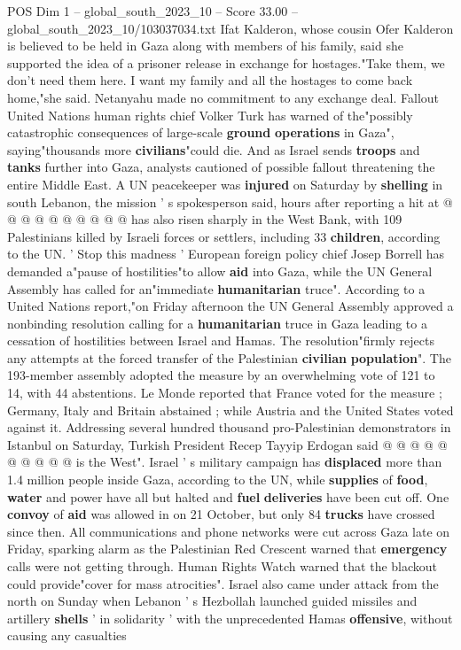 \begin{textsample}{POS Dim 1 – global\_south\_2023\_10 – Score 33.00 – global\_south\_2023\_10/103037034.txt}
Ifat Kalderon, whose cousin Ofer Kalderon is believed to be held in Gaza along with members of his family, said she supported the idea of a prisoner release in exchange for hostages."Take them, we don't need them here.
I want my family and all the hostages to come back home,"she said.
Netanyahu made no commitment to any exchange deal.
Fallout United Nations human rights chief Volker Turk has warned of the"possibly catastrophic consequences of large-scale \textbf{ground} \textbf{operations} in Gaza", saying"thousands more \textbf{civilians}"could die.
And as Israel sends \textbf{troops} and \textbf{tanks} further into Gaza, analysts cautioned of possible fallout threatening the entire Middle East.
A UN peacekeeper was \textbf{injured} on Saturday by \textbf{shelling} in south Lebanon, the mission ' s spokesperson said, hours after reporting a hit at @ @ @ @ @ @ @ @ @ @ has also risen sharply in the West Bank, with 109 Palestinians killed by Israeli forces or settlers, including 33 \textbf{children}, according to the UN. ' Stop this madness ' European foreign policy chief Josep Borrell has demanded a"pause of hostilities"to allow \textbf{aid} into Gaza, while the UN General Assembly has called for an"immediate \textbf{humanitarian} truce".
According to a United Nations report,"on Friday afternoon the UN General Assembly approved a nonbinding resolution calling for a \textbf{humanitarian} truce in Gaza leading to a cessation of hostilities between Israel and Hamas.
The resolution"firmly rejects any attempts at the forced transfer of the Palestinian \textbf{civilian} \textbf{population}".
The 193-member assembly adopted the measure by an overwhelming vote of 121 to 14, with 44 abstentions.
Le Monde reported that France voted for the measure ; Germany, Italy and Britain abstained ; while Austria and the United States voted against it.
Addressing several hundred thousand pro-Palestinian demonstrators in Istanbul on Saturday, Turkish President Recep Tayyip Erdogan said @ @ @ @ @ @ @ @ @ @ is the West".
Israel ' s military campaign has \textbf{displaced} more than 1.4 million people inside Gaza, according to the UN, while \textbf{supplies} of \textbf{food}, \textbf{water} and power have all but halted and \textbf{fuel} \textbf{deliveries} have been cut off.
One \textbf{convoy} of \textbf{aid} was allowed in on 21 October, but only 84 \textbf{trucks} have crossed since then.
All communications and phone networks were cut across Gaza late on Friday, sparking alarm as the Palestinian Red Crescent warned that \textbf{emergency} calls were not getting through.
Human Rights Watch warned that the blackout could provide"cover for mass atrocities".
Israel also came under attack from the north on Sunday when Lebanon ' s Hezbollah launched guided missiles and artillery \textbf{shells} ' in solidarity ' with the unprecedented Hamas \textbf{offensive}, without causing any casualties


\end{textsample}
